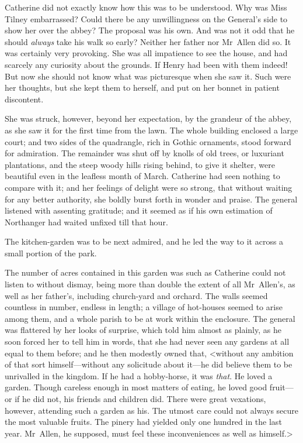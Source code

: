  Catherine did not exactly know how this was to be understood. Why was Miss Tilney embarrassed? Could there be any unwillingness on the General's side to show her over the abbey? The proposal was his own. And was not it odd that he should \textit{always} take his walk so early? Neither her father nor Mr~Allen did so. It was certainly very provoking. She was all impatience to see the house, and had scarcely any curiosity about the grounds. If Henry had been with them indeed! But now she should not know what was picturesque when she saw it. Such were her thoughts, but she kept them to herself, and put on her bonnet in patient discontent. 

 She was struck, however, beyond her expectation, by the grandeur of the abbey, as she saw it for the first time from the lawn. The whole building enclosed a large court; and two sides of the quadrangle, rich in Gothic ornaments, stood forward for admiration. The remainder was shut off by knolls of old trees, or luxuriant plantations, and the steep woody hills rising behind, to give it shelter, were beautiful even in the leafless month of March. Catherine had seen nothing to compare with it; and her feelings of delight were so strong, that without waiting for any better authority, she boldly burst forth in wonder and praise. The general listened with assenting gratitude; and it seemed as if his own estimation of Northanger had waited unfixed till that hour. 

 The kitchen-garden was to be next admired, and he led the way to it across a small portion of the park. 

 The number of acres contained in this garden was such as Catherine could not listen to without dismay, being more than double the extent of all Mr~Allen's, as well as her father's, including church-yard and orchard. The walls seemed countless in number, endless in length; a village of hot-houses seemed to arise among them, and a whole parish to be at work within the enclosure. The general was flattered by her looks of surprise, which told him almost as plainly, as he soon forced her to tell him in words, that she had never seen any gardens at all equal to them before; and he then modestly owned that, <without any ambition of that sort himself—without any solicitude about it—he did believe them to be unrivalled in the kingdom. If he had a hobby-horse, it was \textit{that}. He loved a garden. Though careless enough in most matters of eating, he loved good fruit—or if he did not, his friends and children did. There were great vexations, however, attending such a garden as his. The utmost care could not always secure the most valuable fruits. The pinery had yielded only one hundred in the last year. Mr~Allen, he supposed, must feel these inconveniences as well as himself.> 


